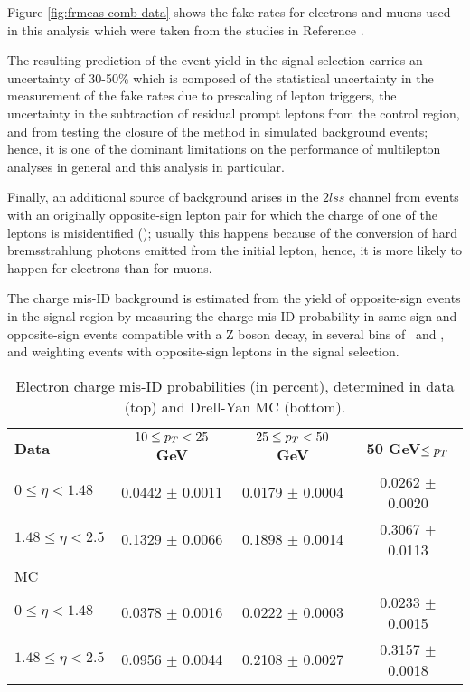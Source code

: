 Figure \ref{fig:frmeas-comb-data} shows the fake rates for electrons and muons used in this analysis which were taken from the studies in Reference \cite{CMS_AN_2017-029}.

The resulting prediction of the event yield in the signal selection carries an uncertainty of 30-50\% which is composed of the statistical uncertainty in the measurement of the fake rates due to prescaling of lepton triggers, the uncertainty in the subtraction of residual prompt leptons from the control region, and from testing the closure of the method in simulated background events; hence, it is one of the dominant limitations on the performance of multilepton analyses in general and this analysis in particular.

Finally, an additional source of background arises in the $2lss$ channel from events with an originally opposite-sign lepton pair for which the charge of one of the leptons is misidentified (); usually this happens because of the conversion of hard bremsstrahlung photons emitted from the initial lepton, hence, it is more likely to happen for electrons than for muons.

The charge mis-ID background is estimated from the yield of opposite-sign events in the signal region by measuring the charge mis-ID probability in same-sign and opposite-sign events compatible with a Z boson decay, in several bins of \pt\ and \etac, and weighting events with opposite-sign leptons in the signal selection.

\begin{table}[htp]
\centering
\begin{tabular}{lccc}\hline
 Data                & $10\leq p_T<25$ GeV  & $25\leq p_T<50$ GeV  & 50 GeV$\leq p_T$ \\\hline
$0\leq\eta<1.48$     & 0.0442 $\pm$ 0.0011 & 0.0179 $\pm$ 0.0004 & 0.0262 $\pm$ 0.0020 \\
$1.48\leq\eta<2.5$   & 0.1329 $\pm$ 0.0066 & 0.1898 $\pm$ 0.0014 & 0.3067 $\pm$ 0.0113 \\\hline
 MC                  &                     &                     &                      \\\hline
$0\leq\eta<1.48$     & 0.0378 $\pm$ 0.0016 & 0.0222 $\pm$ 0.0003 & 0.0233 $\pm$ 0.0015 \\
$1.48\leq\eta<2.5$   & 0.0956 $\pm$ 0.0044 & 0.2108 $\pm$ 0.0027 & 0.3157 $\pm$ 0.0018 \\\hline
\end{tabular}
\caption[Electron charge mis-ID probabilities.]{Electron charge mis-ID probabilities (in percent), determined in data (top) and Drell-Yan MC (bottom)\cite{CMS_AN_2017-029}.}
\label{tab:chmisid_prob}
\end{table}

